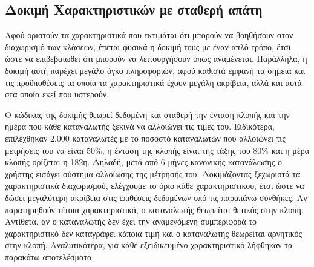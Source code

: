 \subsection{Δοκιμή Χαρακτηριστικών με σταθερή απάτη}
Αφού οριστούν τα χαρακτηριστικά που εκτιμάται ότι μπορούν να βοηθήσουν στον διαχωρισμό των κλάσεων, έπεται φυσικά η δοκιμή τους με έναν απλό τρόπο, έτσι ώστε να επιβεβαιωθεί ότι μπορούν να λειτουργήσουν όπως αναμένεται. Παράλληλα, η δοκιμή αυτή παρέχει μεγάλο όγκο πληροφοριών, αφού καθιστά εμφανή τα σημεία και τις προϋποθέσεις τα οποία τα χαρακτηριστικά έχουν μεγάλη ακρίβεια, αλλά και αυτά στα οποία εκεί που υστερούν.\par
Ο κώδικας της δοκιμής θεωρεί δεδομένη και σταθερή την ένταση κλοπής και την ημέρα που κάθε καταναλωτής ξεκινά να αλλοιώνει τις τιμές του. Ειδικότερα, επιλέχθηκαν 2.000 καταναλωτές με το ποσοστό καταναλωτών που αλλοιώνει τις μετρήσεις του να είναι 50\%, η ένταση της κλοπής είναι της τάξης του 80\% και η μέρα κλοπής ορίζεται η 182η. Δηλαδή, μετά από 6 μήνες κανονικής κατανάλωσης ο χρήστης εισάγει σύστημα αλλοίωσης της μέτρησής του. Δοκιμάζοντας ξεχωριστά τα χαρακτηριστικά διαχωρισμού, ελέγχουμε το όριο κάθε χαρακτηριστικού, έτσι ώστε να δώσει μεγαλύτερη ακρίβεια στις επιθέσεις δεδομένων υπό τις παραπάνω συνθήκες. Αν  παρατηρηθούν τέτοια χαρακτηριστικά, ο καταναλωτής θεωρείται θετικός στην κλοπή. Αντίθετα, αν ο καταναλωτής δεν έχει την αναμενόμενη συμπεριφορά το χαρακτηριστικό δεν καταγράφει κάποια τιμή και ο καταναλωτής θεωρείται αρνητικός στην κλοπή. Αναλυτικότερα, για κάθε εξειδικευμένο χαρακτηριστικό λήφθηκαν τα παρακάτω αποτελέσματα:
